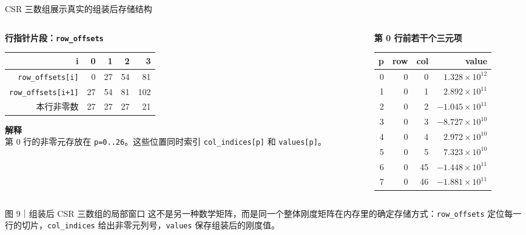 \documentclass[UTF8,aspectratio=169,10pt]{ctexbeamer}
\newcommand{\code}[1]{\texttt{#1}}
\newcommand{\sourcecn}[1]{\vspace{0.2em}{\scriptsize\textcolor{pgsaGray}{数据来源：#1}}}
\newcommand{\figbox}[3]{%
  \begin{block}{图 #1｜#2}
    {\scriptsize #3}
  \end{block}
}
\begin{document}
\begin{frame}{CSR 三数组展示真实的组装后存储结构}
\scriptsize
\begin{columns}[T,onlytextwidth]
\begin{column}{0.42\textwidth}
\textbf{行指针片段：\code{row\_offsets}}
\begin{adjustbox}{max width=\linewidth}
\begin{tabular}{rrrrr}
\toprule
i & 0 & 1 & 2 & 3 \\
\midrule
\code{row\_offsets[i]} & 0 & 27 & 54 & 81 \\
\code{row\_offsets[i+1]} & 27 & 54 & 81 & 102 \\
本行非零数 & 27 & 27 & 27 & 21 \\
\bottomrule
\end{tabular}
\end{adjustbox}

\vspace{0.7em}
\textbf{解释}\\
第 0 行的非零元存放在 \code{p=0..26}。这些位置同时索引 \code{col\_indices[p]} 和 \code{values[p]}。
\end{column}
\begin{column}{0.55\textwidth}
\textbf{第 0 行前若干个三元项}
\begin{adjustbox}{max width=\linewidth}
\begin{tabular}{rrrr}
\toprule
p & row & col & value \\
\midrule
0 & 0 & 0  & $1.328{\times}10^{12}$ \\
1 & 0 & 1  & $2.892{\times}10^{11}$ \\
2 & 0 & 2  & $-1.045{\times}10^{11}$ \\
3 & 0 & 3  & $-8.727{\times}10^{10}$ \\
4 & 0 & 4  & $2.972{\times}10^{10}$ \\
5 & 0 & 5  & $7.323{\times}10^{10}$ \\
6 & 0 & 45 & $-1.448{\times}10^{11}$ \\
7 & 0 & 46 & $-1.881{\times}10^{11}$ \\
\bottomrule
\end{tabular}
\end{adjustbox}
\end{column}
\end{columns}
\figbox{9}{组装后 CSR 三数组的局部窗口}{这不是另一种数学矩阵，而是同一个整体刚度矩阵在内存里的确定存储方式：\code{row\_offsets} 定位每一行的切片，\code{col\_indices} 给出非零元列号，\code{values} 保存组装后的刚度值。}
\sourcecn{assets/windhub\_physics\_tet4\_serial\_csr\_window.csv；行窗口 [0,4)}
\end{frame}
\end{document}
